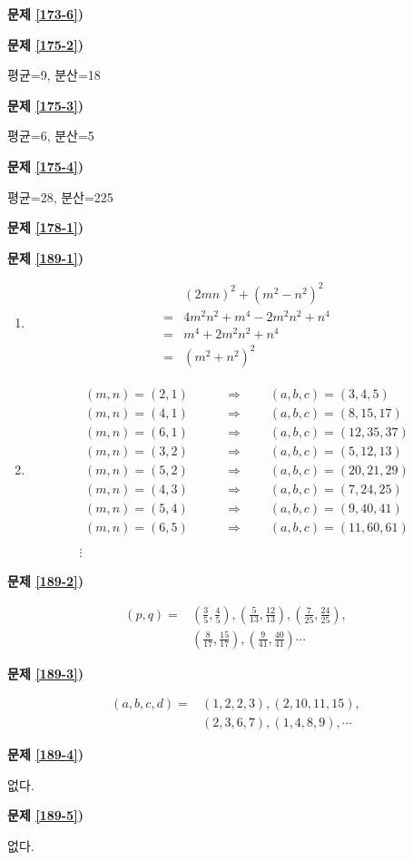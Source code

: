\documentclass[a4paper,twocolumn]{oblivoir}
\newcounter{num}
\newcommand\an[1]{\par\bigskip\noindent\textbf{문제 \ref{#1})}\par\noindent}
\newcommand\ann[2]{\par\bigskip\noindent\textbf{문제 \ref{#1})}\:\:#2\par\medskip\noindent}
\begin{document}
%
\ann{173-6}{18}

%
\an{175-2}
평균=9, 분산=18

%
\an{175-3}
평균=6, 분산=5

%
\an{175-4}
평균=28, 분산=225

%
\ann{178-1}{30}
\newpage
%
\an{189-1}
\begin{enumerate}
\item
\begin{align*}
&(2mn)^2+(m^2-n^2)^2\\
=&4m^2n^2+m^4-2m^2n^2+n^4\\
=&m^4+2m^2n^2+n^4\\
=&(m^2+n^2)^2
\end{align*}
\item
\begin{gather*}
\begin{aligned}
(m,n)=(2,1)&\qquad\Longrightarrow\qquad (a,b,c)=(3,4,5)\\
(m,n)=(4,1)&\qquad\Longrightarrow\qquad (a,b,c)=(8,15,17)\\
(m,n)=(6,1)&\qquad\Longrightarrow\qquad (a,b,c)=(12,35,37)\\
(m,n)=(3,2)&\qquad\Longrightarrow\qquad (a,b,c)=(5,12,13)\\
(m,n)=(5,2)&\qquad\Longrightarrow\qquad (a,b,c)=(20,21,29)\\
(m,n)=(4,3)&\qquad\Longrightarrow\qquad (a,b,c)=(7,24,25)\\
(m,n)=(5,4)&\qquad\Longrightarrow\qquad (a,b,c)=(9,40,41)\\
(m,n)=(6,5)&\qquad\Longrightarrow\qquad (a,b,c)=(11,60,61)\\
\end{aligned}\\
\vdots
\end{gather*}
\end{enumerate}

%
\an{189-2}
\begin{align*}
(p,q)=
&\left(\frac35,\frac45\right),\left(\frac{5}{13},\frac{12}{13}\right),\left(\frac{7}{25},\frac{24}{25}\right),\\
&\left(\frac{8}{17},\frac{15}{17}\right),\left(\frac{9}{41},\frac{40}{41}\right)\cdots
\end{align*}

%
\an{189-3}
\begin{align*}
(a,b,c,d)=
&(1,2,2,3),(2,10,11,15),\\
&(2,3,6,7),(1,4,8,9),\cdots
\end{align*}

\newpage
%
\an{189-4}
없다.

%
\an{189-5}
없다.\footnotemark

\end{document}
